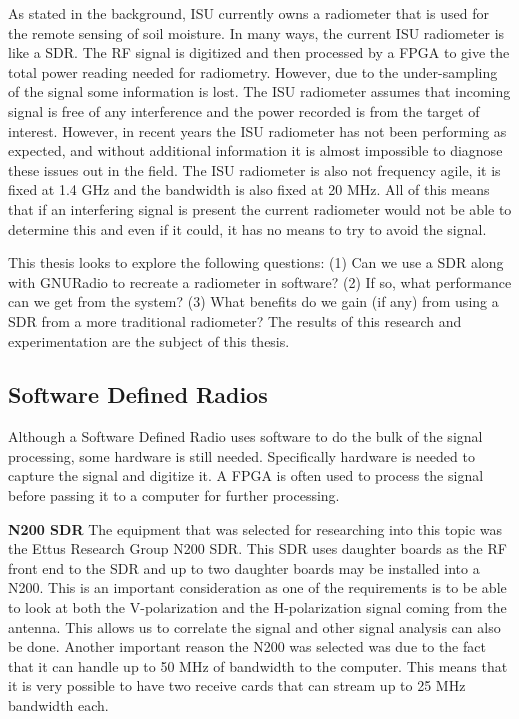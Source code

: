 As stated in the background, ISU currently owns a radiometer that is used for the remote sensing of soil moisture.  In many ways, the current ISU radiometer is like a SDR.  The RF signal is digitized and then processed by a FPGA to give the total power reading needed for radiometry.  However, due to the under-sampling of the signal some information is lost.  The ISU radiometer assumes that incoming signal is free of any interference and the power recorded is from the target of interest.  However, in recent years the ISU radiometer has not been performing as expected, and without additional information it is almost impossible to diagnose these issues out in the field.  The ISU radiometer is also not frequency agile, it is fixed at 1.4 GHz and the bandwidth is also fixed at 20 MHz.  All of this means that if an interfering signal is present the current radiometer would not be able to determine this and even if it could, it has no means to try to avoid the signal.  

This thesis looks to explore the following questions: (1) Can we use a SDR along with GNURadio to recreate a radiometer in software?  (2) If so, what performance can we get from the system?  (3) What benefits do we gain (if any) from using a SDR from a more traditional radiometer?  The results of this research and experimentation are the subject of this thesis.


\subsection{Software Defined Radios}

Although a Software Defined Radio uses software to do the bulk of the signal processing, some hardware is still needed.  Specifically hardware is needed to capture the signal and digitize it.  A FPGA is often used to process the signal before passing it to a computer for further processing.

\textbf{N200 SDR} The equipment that was selected for researching into this topic was the Ettus Research Group N200 SDR.  This SDR uses daughter boards as the RF front end to the SDR and up to two daughter boards may be installed into a N200.  This is an important consideration as one of the requirements is to be able to look at both the V-polarization and the H-polarization signal coming from the antenna.  This allows us to correlate the signal and other signal analysis can also be done.  Another important reason the N200 was selected was due to the fact that it can handle up to 50 MHz of bandwidth to the computer.  This means that it is very possible to have two receive cards that can stream up to 25 MHz bandwidth each.  

